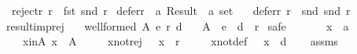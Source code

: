 \begin{isabellebody}
\ \ {\isachardoublequoteopen}reject{\isacharunderscore}{\kern0pt}r\ r\ {\isasymequiv}\ fst\ {\isacharparenleft}{\kern0pt}snd\ r{\isacharparenright}{\kern0pt}{\isachardoublequoteclose}\isanewline
\isanewline
{}\isamarkupfalse%
\ defer{\isacharunderscore}{\kern0pt}r\ {\isacharcolon}{\kern0pt}{\isacharcolon}{\kern0pt}\ {\isachardoublequoteopen}{\isacharprime}{\kern0pt}a\ Result\ {\isasymRightarrow}\ {\isacharprime}{\kern0pt}a\ set{\isachardoublequoteclose}\ \isanewline
\ \ {\isachardoublequoteopen}defer{\isacharunderscore}{\kern0pt}r\ r\ {\isasymequiv}\ snd\ {\isacharparenleft}{\kern0pt}snd\ r{\isacharparenright}{\kern0pt}{\isachardoublequoteclose}%
\isadelimdocument
%
\endisadelimdocument
%
\isatagdocument
%
\isamarkuptrue%
%
\endisatagdocument
{\isafolddocument}%
%
\isadelimdocument
%
\endisadelimdocument
{}\isamarkupfalse%
\ result{\isacharunderscore}{\kern0pt}imp{\isacharunderscore}{\kern0pt}rej{\isacharcolon}{\kern0pt}\isanewline
\ \ \ {\isachardoublequoteopen}well{\isacharunderscore}{\kern0pt}formed\ A\ {\isacharparenleft}{\kern0pt}e{\isacharcomma}{\kern0pt}\ r{\isacharcomma}{\kern0pt}\ d{\isacharparenright}{\kern0pt}{\isachardoublequoteclose}\isanewline
\ \ \ {\isachardoublequoteopen}A\ {\isacharminus}{\kern0pt}\ {\isacharparenleft}{\kern0pt}e\ {\isasymunion}\ d{\isacharparenright}{\kern0pt}\ {\isacharequal}{\kern0pt}\ r{\isachardoublequoteclose}\isanewline
%
\isadelimproof
%
\endisadelimproof
%
\isatagproof
{}\isamarkupfalse%
\ {\isacharparenleft}{\kern0pt}safe{\isacharparenright}{\kern0pt}\isanewline
\ \ \isamarkupfalse%
\isanewline
\ \ \ \ x\ {\isacharcolon}{\kern0pt}{\isacharcolon}{\kern0pt}\ {\isachardoublequoteopen}{\isacharprime}{\kern0pt}a{\isachardoublequoteclose}\isanewline
\ \ \isamarkupfalse%
\isanewline
\ \ \ \ x{\isacharunderscore}{\kern0pt}in{\isacharunderscore}{\kern0pt}A{\isacharcolon}{\kern0pt}\ {\isachardoublequoteopen}x\ {\isasymin}\ A{\isachardoublequoteclose}\ \isanewline
\ \ \ \ x{\isacharunderscore}{\kern0pt}not{\isacharunderscore}{\kern0pt}rej{\isacharcolon}{\kern0pt}\ \ \ {\isachardoublequoteopen}x\ {\isasymnotin}\ r{\isachardoublequoteclose}\ \isanewline
\ \ \ \ x{\isacharunderscore}{\kern0pt}not{\isacharunderscore}{\kern0pt}def{\isacharcolon}{\kern0pt}\ \ \ {\isachardoublequoteopen}x\ {\isasymnotin}\ d{\isachardoublequoteclose}\isanewline
\ \ \isamarkupfalse%
\ assms\ \isamarkupfalse%

\end{isabellebody}
